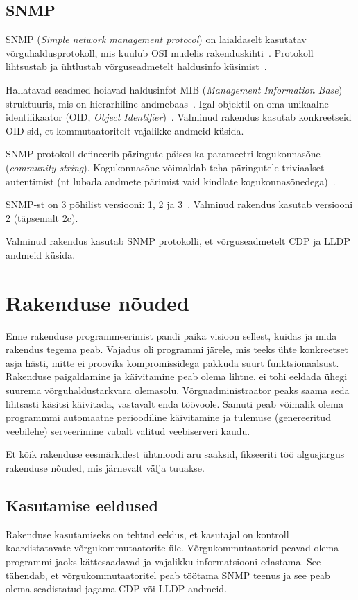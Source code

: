 \documentclass[12pt]{article}
\begin{document}
\subsection{SNMP} \label{subsec:snmp}
SNMP (\textit{Simple network management protocol}) on laialdaselt kasutatav
võrguhaldusprotokoll, mis kuulub OSI mudelis rakenduskihti~\cite[151]{sissejuhVorg}.
Protokoll lihtsustab ja ühtlustab võrguseadmetelt haldusinfo küsimist~\cite[151]{sissejuhVorg}.

Hallatavad seadmed hoiavad haldusinfot MIB (\textit{Management Information Base}) struktuuris,
mis on hierarhiline andmebaas~\cite[152]{sissejuhVorg}.
Igal objektil on oma unikaalne identifikaator (OID, \textit{Object Identifier})~\cite[152]{sissejuhVorg}.
Valminud rakendus kasutab konkreetseid OID-sid, et kommutaatoritelt vajalikke andmeid küsida.

SNMP protokoll defineerib päringute päises ka parameetri kogukonnasõne (\textit{community string}).
Kogukonnasõne võimaldab teha päringutele triviaalset autentimist (nt lubada andmete pärimist
vaid kindlate kogukonnasõnedega)~\cite[154-155]{sissejuhVorg}.

SNMP-st on 3 põhilist versiooni: 1, 2 ja 3~\cite[151]{sissejuhVorg}.
Valminud rakendus kasutab versiooni 2 (täpsemalt 2c).

Valminud rakendus kasutab SNMP protokolli, et võrguseadmetelt CDP ja LLDP andmeid küsida.


\newpage
\section{Rakenduse nõuded} \label{reqs}
Enne rakenduse programmeerimist pandi paika visioon sellest, kuidas ja mida rakendus tegema peab.
Vajadus oli programmi järele, mis teeks ühte konkreetset asja hästi, mitte ei prooviks
kompromissidega pakkuda suurt funktsionaalsust.
Rakenduse paigaldamine ja käivitamine peab olema lihtne, ei tohi eeldada ühegi suurema
võrguhaldustarkvara olemasolu.
Võrguadministraator peaks saama seda lihtsasti käsitsi käivitada, vastavalt enda töövoole.
Samuti peab võimalik olema programmmi automaatne perioodiline käivitamine ja tulemuse (genereeritud
veebilehe) serveerimine vabalt valitud veebiserveri kaudu.

Et kõik rakenduse eesmärkidest ühtmoodi aru saaksid, fikseeriti töö algusjärgus rakenduse nõuded,
mis järnevalt välja tuuakse.

\subsection{Kasutamise eeldused}
Rakenduse kasutamiseks on tehtud eeldus, et kasutajal on kontroll kaardistatavate võrgukommutaatorite üle.
Võrgukommutaatorid peavad olema programmi jaoks kättesaadavad ja vajalikku informatsiooni edastama.
See tähendab, et võrgukommutaatoritel peab töötama SNMP teenus ja see peab olema seadistatud jagama
CDP või LLDP andmeid.
\end{document}
